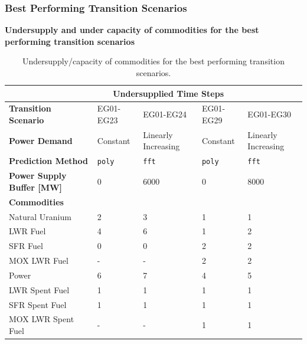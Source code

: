 \begin{frame}
  \frametitle{Best Performing Transition Scenarios}
  \textbf{Undersupply and under capacity of commodities for the best performing transition scenarios} 
  \begin{table}[]
      \centering
          \caption{Undersupply/capacity of commodities for the best performing transition scenarios.}
          \label{tab:all-power}
          \footnotesize
          \begin{tabularx}{\textwidth}{l|llll}
          \hline
          & \multicolumn{3}{|c}{\textbf{Undersupplied Time Steps}} \\ \hline
          \textbf{Transition Scenario} & EG01-EG23 & 
          EG01-EG24 & EG01-EG29 & 
          EG01-EG30 \\ 
          \textbf{Power Demand} &Constant&Linearly Increasing&Constant&Linearly Increasing \\
          \textbf{Prediction Method} &\texttt{poly}&\texttt{fft}&\texttt{poly}& \texttt{fft}\\
          \textbf{Power Supply Buffer [MW]} &0&6000&0&8000 \\ \hline
          \textbf{Commodities} \\ 
          Natural Uranium		    & 2 	& 3  &  1  & 1 \\ 
          \gls{LWR} Fuel     	    & 4 	& 6  &  1  & 2\\ 
          \gls{SFR} Fuel     	    &  0 	& 0  &  2  & 2\\ 
          \gls{MOX} \gls{LWR} Fuel &-&-&2&2 \\
          Power      				&  6 	& 7  &  4 &  5\\ 
          \gls{LWR} Spent Fuel	& 1 	& 1  & 1 & 1\\ 
          \gls{SFR} Spent Fuel     	    &  1 	& 1  &  1  & 1\\ 
          \gls{MOX} \gls{LWR} Spent Fuel &-&-&1&1 \\ \hline 
      \end{tabularx}
  \end{table}
  
\end{frame}

